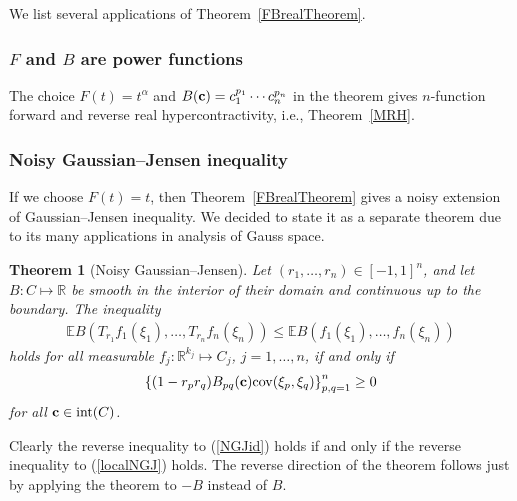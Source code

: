 \documentclass[9pt, a4paper]{amsart}
\newcommand{\1}{{\chi_{}}}%
\newtheorem{theorem}{Theorem}
\numberwithin{equation}{section}
\begin{document}
We list several applications of Theorem~\ref{FBrealTheorem}. 
\subsubsection{$F$ and $B$ are power functions} The choice $F(t)=t^{\alpha}$ and $B({\bf c})=c_{1}^{p_{1}}\cdots c_{n}^{p_{n}}$ in the theorem  gives $n$-function forward and reverse real hypercontractivity, i.e., Theorem~\ref{MRH}.

\subsubsection{Noisy Gaussian--Jensen inequality}

If we choose $F(t)=t$, then Theorem~\ref{FBrealTheorem} gives a noisy extension of Gaussian--Jensen inequality. We decided to state it as a separate theorem due to its many applications in analysis of Gauss space.
\begin{theorem}[Noisy Gaussian--Jensen]\label{NGJT}
Let $(r_{1}, \ldots, r_{n})\in [-1,1]^{n}$, and let $B : C \mapsto \mathbb{R}$ be smooth in the interior of their domain and continuous up to the boundary. The inequality 
\begin{align}\label{NGJid}
    \mathbb{E} B(T_{r_{1}}f_{1}(\xi_{1}), \ldots, T_{r_{n}}f_{n}(\xi_{n})) \leq \mathbb{E} B(f_{1}(\xi_{1}), \ldots, f_{n}(\xi_{n}))
\end{align}
holds for all measurable $f_{j} : \mathbb{R}^{k_{j}} \mapsto  C_{j}$, $j=1, \ldots, n$,  if and only if 
\begin{align}\label{localNGJ}
    \left\{(1-r_{p}r_{q})B_{pq}({\bf c}) \mathrm{cov}(\xi_{p}, \xi_{q}) \right\}_{p,q=1}^{n}\geq 0
\end{align}
for all ${\bf c} \in \mathrm{int}(C)$.   
\end{theorem}
Clearly the reverse inequality to (\ref{NGJid}) holds if and only if the reverse inequality to (\ref{localNGJ}) holds. The reverse direction of the theorem follows just by applying the theorem to $-B$ instead of $B$. 
\end{document}
